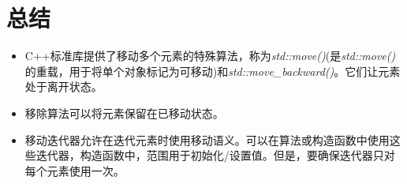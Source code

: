 \section{总结}
\begin{itemize}
	\item C++标准库提供了移动多个元素的特殊算法，称为\textit{std::move()}(是\textit{std::move()}的重载，用于将单个对象标记为可移动)和\textit{std::move_backward()}。它们让元素处于离开状态。
	\item 移除算法可以将元素保留在已移动状态。
	\item 移动迭代器允许在迭代元素时使用移动语义。可以在算法或构造函数中使用这些迭代器，构造函数中，范围用于初始化/设置值。但是，要确保迭代器只对每个元素使用一次。
\end{itemize}


